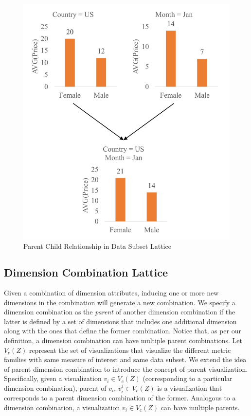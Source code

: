 \begin{figure}[bht]
\label{example}
\centering
\includegraphics[scale=0.75]{SubsetRelation.pdf}
\caption{Parent Child Relationship in Data Subset Lattice}
\end{figure}
 



\subsection{Dimension Combination Lattice}
Given a combination of dimension attributes, inducing one or more new dimensions in the combination will generate a new combination. We specify a dimension combination as the \emph{parent} of another dimension combination if the latter is defined by a set of dimensions that includes one additional dimension along with the ones that define the former combination. Notice that, as per our definition, a dimension combination can have multiple parent combinations.
 \newline
 \newline
Let $V_c(Z)$ represent the set of visualizations that visualize the different metric families with same measure of interest and same data subset. We extend the idea of parent dimension combination to introduce the concept of parent visualization. Specifically, given a visualization $v_i \in V_c(Z)$ (corresponding to a particular dimension combination), parent of $v_i$, $v_i^j \in V_c(Z)$ is a visualization that corresponds to a parent dimension combination of the former. Analogous to a dimension combination, a visualization $v_i \in V_c(Z)$ can have multiple parents. 

